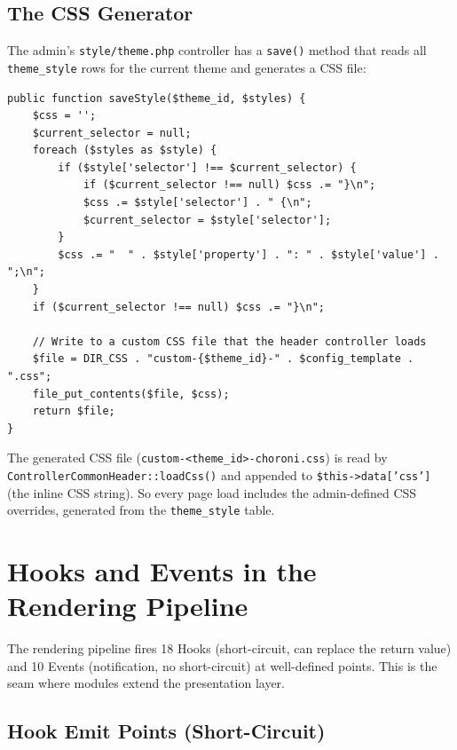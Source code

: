 \documentclass[11pt,a4paper]{article}
\begin{document}
\subsection{The CSS Generator}

The admin's \texttt{style/theme.php} controller has a \texttt{save()}
method that reads all \texttt{theme\_style} rows for the current
theme and generates a CSS file:

\begin{lstlisting}[caption={\texttt{ModelStyleTheme::saveStyle()} --- the CSS generator (abridged).},label={lst:css-gen}]
public function saveStyle($theme_id, $styles) {
    $css = '';
    $current_selector = null;
    foreach ($styles as $style) {
        if ($style['selector'] !== $current_selector) {
            if ($current_selector !== null) $css .= "}\n";
            $css .= $style['selector'] . " {\n";
            $current_selector = $style['selector'];
        }
        $css .= "  " . $style['property'] . ": " . $style['value'] . ";\n";
    }
    if ($current_selector !== null) $css .= "}\n";

    // Write to a custom CSS file that the header controller loads
    $file = DIR_CSS . "custom-{$theme_id}-" . $config_template . ".css";
    file_put_contents($file, $css);
    return $file;
}
\end{lstlisting}

The generated CSS file (\texttt{custom-<theme\_id>-choroni.css})
is read by \texttt{ControllerCommonHeader::loadCss()} and
appended to \texttt{\$this->data['css']} (the inline CSS string).
So every page load includes the admin-defined CSS overrides,
generated from the \texttt{theme\_style} table.

\section{Hooks and Events in the Rendering Pipeline}\label{sec:hooks-seams}

The rendering pipeline fires 18 Hooks (short-circuit, can replace
the return value) and 10 Events (notification, no short-circuit)
at well-defined points. This is the seam where modules extend
the presentation layer.

\subsection{Hook Emit Points (Short-Circuit)}
\end{document}
